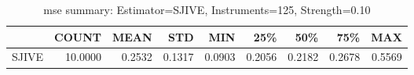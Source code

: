 \begin{table}[ht]
\centering
\caption{mse summary: Estimator=SJIVE, Instruments=125, Strength=0.10}
\begin{tabular}{lrrrrrrrr}
\toprule
 & COUNT & MEAN & STD & MIN & 25\% & 50\% & 75\% & MAX \\
\midrule
SJIVE & 10.0000 & 0.2532 & 0.1317 & 0.0903 & 0.2056 & 0.2182 & 0.2678 & 0.5569 \\
\bottomrule
\end{tabular}
\end{table}
